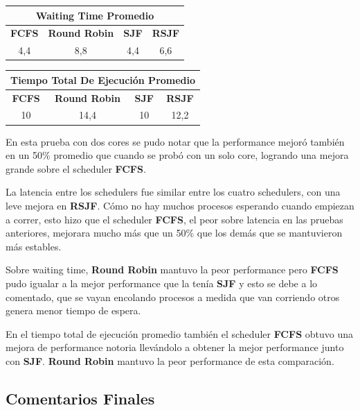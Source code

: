 \begin{center}
	\begin{tabular}{|c|c|c|c|}
		\hline
		\multicolumn{4}{|c|}{\large{\textbf{Waiting Time Promedio}}} \\
		\hline
		\textbf{FCFS} & \textbf{Round Robin} & \textbf{SJF} & \textbf{RSJF} \\
		\hline
		4,4 & 8,8 & 4,4 & 6,6 \\
		\hline
	\end{tabular}
\end{center}

\begin{center}
	\begin{tabular}{|c|c|c|c|}
		\hline
		\multicolumn{4}{|c|}{\large{\textbf{Tiempo Total De Ejecución Promedio}}} \\
		\hline
		\textbf{FCFS} & \textbf{Round Robin} & \textbf{SJF} & \textbf{RSJF} \\
		\hline
		10 & 14,4 & 10 & 12,2 \\
		\hline
	\end{tabular}
\end{center}

En esta prueba con dos cores se pudo notar que la performance mejoró también en un 50\% promedio que cuando se probó con un solo core, logrando una mejora grande sobre el scheduler \textbf{FCFS}.

La latencia entre los schedulers fue similar entre los cuatro schedulers, con una leve mejora en \textbf{RSJF}. Cómo no hay muchos procesos esperando cuando empiezan a correr, esto hizo que el scheduler \textbf{FCFS}, el peor sobre latencia en las pruebas anteriores, mejorara mucho más que un 50\% que los demás que se mantuvieron más estables.

Sobre waiting time, \textbf{Round Robin} mantuvo la peor performance pero \textbf{FCFS} pudo igualar a la mejor performance que la tenía \textbf{SJF} y esto se debe a lo comentado, que se vayan encolando procesos a medida que van corriendo otros genera menor tiempo de espera.

En el tiempo total de ejecución promedio también el scheduler \textbf{FCFS} obtuvo una mejora de performance notoria llevándolo a obtener la mejor performance junto con \textbf{SJF}. \textbf{Round Robin} mantuvo la peor performance de esta comparación.

\subsection{Comentarios Finales}

